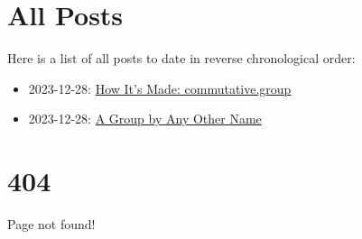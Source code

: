 \documentclass{article}
\begin{document}
\part*{\centering All Posts}

\newline

Here is a list of all posts to date in reverse chronological order:

\begin{itemize}
\item 2023-12-28: \href{posts/abel.html}{How It's Made: commutative.group}
\item 2023-12-28: \href{posts/other_name.html}{A Group by Any Other Name}
\end{itemize}

\part*{404}

\newline

Page not found!
\end{document}
